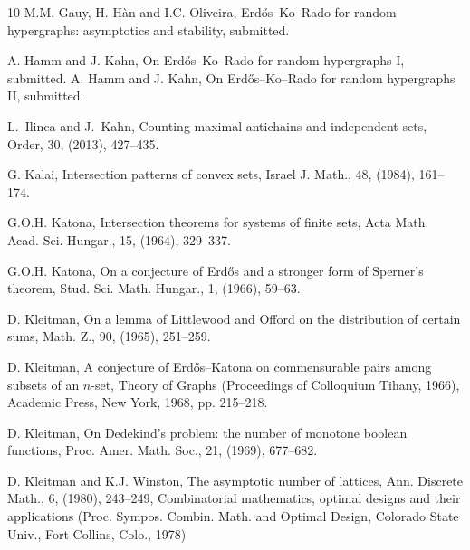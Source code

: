 \documentclass[11pt]{article}
\numberwithin{equation}{section}
\begin{document}
\begin{thebibliography}{10}
 M.M. Gauy, H. H\`an and I.C. Oliveira, Erd\H{o}s--Ko--Rado for random hypergraphs: asymptotics
and stability, submitted.




 A. Hamm and J. Kahn, On Erd\H{o}s--Ko--Rado for random hypergraphs I, submitted. 
 A. Hamm and J. Kahn, On Erd\H{o}s--Ko--Rado for random hypergraphs II, submitted. 

L.~Ilinca and J.~Kahn,
\newblock Counting maximal antichains and independent sets,
\newblock  Order, 30, (2013), 427--435.

 G. Kalai, Intersection patterns of convex sets, Israel J. Math., 48,  (1984), 161--174.

 G.O.H. Katona, Intersection theorems for systems of finite sets,
Acta Math. Acad. Sci. Hungar., 15, (1964), 329--337.

 G.O.H. Katona, On a conjecture of Erd\H{o}s and a stronger form of Sperner's theorem, Stud. Sci. Math. Hungar., 1, (1966), 59--63.

 D. Kleitman, On a lemma of Littlewood and Offord on the distribution of certain sums, Math. Z., 90, (1965), 251--259.

 D. Kleitman, A conjecture of Erd\H{o}s--Katona on commensurable pairs among subsets of an $n$-set, Theory of Graphs (Proceedings of Colloquium Tihany, 1966), Academic Press, New York, 1968, pp. 215--218.

 D. Kleitman, On Dedekind’s problem: the number of monotone boolean functions, Proc. Amer. Math. Soc., 21, (1969), 677--682.






 D. Kleitman and K.J. Winston, The asymptotic number of lattices, Ann. Discrete Math., 6,
(1980), 243--249,
Combinatorial mathematics, optimal designs and their applications (Proc. Sympos. Combin. Math. and Optimal
Design, Colorado State Univ., Fort Collins, Colo., 1978)



\end{thebibliography}
\end{document}
